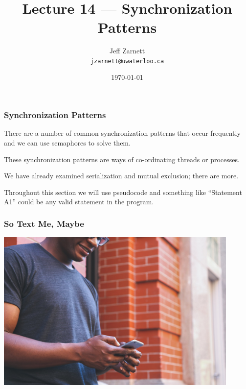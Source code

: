 

\title{Lecture 14 --- Synchronization Patterns }

\author{Jeff Zarnett \\ \small \texttt{jzarnett@uwaterloo.ca}}
\date{\today}




\begin{frame}
	\titlepage

\end{frame}

\begin{frame}
	\frametitle{Synchronization Patterns}


	There are a number of common synchronization patterns that occur frequently and we can use semaphores to solve them.

	These synchronization patterns are ways of co-ordinating threads or processes.

	We have already examined serialization and mutual exclusion; there are more.

	Throughout this section we will use pseudocode and something like ``Statement A1'' could be any valid statement in the program.

\end{frame}


\begin{frame}
	\frametitle{So Text Me, Maybe}

	\begin{center}
		\includegraphics[width=0.9\textwidth]{images/texting.jpeg}
	\end{center}


\end{frame}


